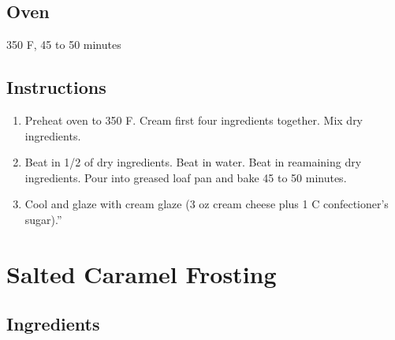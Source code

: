 \documentclass[ansiapaper,10pt,english]{sphinxmanual}
\begin{document}
\section{Oven}
\label{\detokenize{Pumpkin_Bread:oven}}
350 F, 45 to 50 minutes


\section{Instructions}
\label{\detokenize{Pumpkin_Bread:instructions}}\begin{enumerate}
\item {} 
Preheat oven to 350 F.  Cream first four ingredients together.  Mix dry ingredients.

\item {} 
Beat in 1/2 of dry ingredients.  Beat in water.  Beat in reamaining dry ingredients.  Pour into greased loaf pan and bake 45 to 50 minutes.

\item {} 
Cool and glaze with cream glaze (3 oz cream cheese plus 1 C confectioner’s sugar).”

\end{enumerate}


\chapter{Salted Caramel Frosting}
\label{\detokenize{Salted_Caramel_Frosting:salted-caramel-frosting}}\label{\detokenize{Salted_Caramel_Frosting::doc}}

\section{Ingredients}
\label{\detokenize{Salted_Caramel_Frosting:ingredients}}
%
\begin{sphinxVerbatim}[commandchars=\\\{\}]
   

     

   

  

    
\end{sphinxVerbatim}
\end{document}
